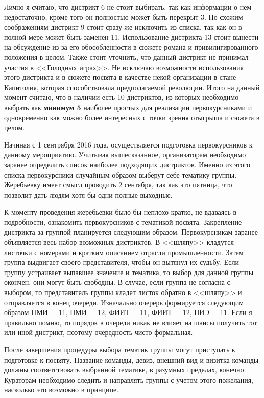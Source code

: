 \documentclass[a4paper, 12pt]{extarticle}
\begin{document}
\par Лично я считаю, что дистрикт 6 не стоит выбирать, так как информации о нем недостаточно, кроме того он полностью может быть перекрыт 3. По схожим соображениям дистрикт 9 стоит сразу же исключить из списка, так как он в полной мере может быть заменен 11. Использование дистрикта 13 стоит вынести на обсуждение из-за его обособленности в сюжете романа и привилигированного положения в целом. Также стоит уточнить, что данный дистрикт не принимал участия в <<Голодных играх>>. Не исключаю возможности использования этого дистрикта и в сюжете посвята в качестве некой организации в стане Капитолия, которая способствовала предполагаемой революции. Итого на данный момент считаю, что в наличии есть 10 дистриктов, из которых необходимо выбрать как \textbf{минимум 5} наиболее простых для реализации первокурсниками и одновременно как можно более интересных с точки зрения отыгрыша и сюжета в целом.

\par Начиная с 1 сентрября 2016 года, осуществляется подготовка первокурсников к данному мероприятию. Учитывая вышесказанное, организаторам необходимо заранее определить список наиболее подходящих дистриктов. Именно из этого списка первокурсники случайным образом выберут себе тематику группы. Жеребьевку имеет смысл проводить 2 сентября, так как это пятница, что позволит дать людям хотя бы одни полные выходные.

\par К моменту проведения жеребьевки было бы неплохо кратко, не вдаваясь в подробности, ознакомить первокурсников с тематикой посвята. Закрепление дистрикта за группой планируется следующим образом. Первокурсникам заранее объявляется весь набор возможных дистриктов. В <<шляпу>> кладутся листочки с номерами и кратким описанием отрасли промышленности. Затем группа выдвигает своего представителя, чтобы он вытянул их судьбу. Если группу устраивает выпавшее значение и тематика, то выбор для данной группы окончен, они могут быть свободны. В случае, если группа не согласна с выбором, то представитель группы кладет листок обратно в <<шляпу>> и отправляется в конец очереди. Изначально очерерь формируется следующим образом ПМИ~--~11, ПМИ~--~12, ФИИТ~--~11, ФИИТ~--~12, ПИЭ~--~11. Если я правильно помню, то порядок в очереди никак не влияет на шансы получить тот или иной дистрикт, поэтому очередность чисто формальная.

\par После завершения процедуры выбора тематик группы могут приступать к подготовке к посвяту. Название команды, девиз, внешний вид и визитка команды должны соответствовать выбранной тематике, в разумных пределах, конечно. Кураторам необходимо следить и направлять группы с учетом этого пожелания, насколько это возможно в принципе.
\end{document}
